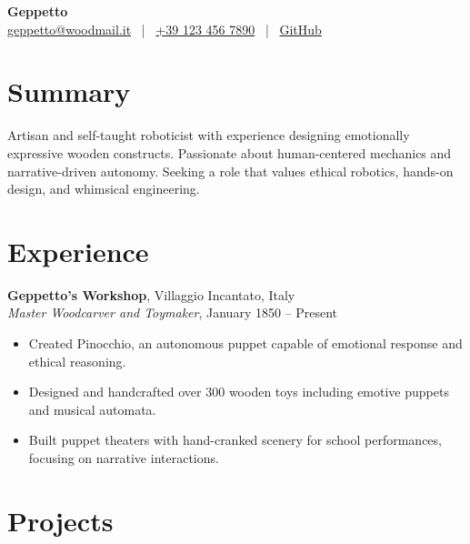 \documentclass[10pt]{article}
\begin{document}
\begin{center}
    {\Large\bfseries{Geppetto}}\\[0.2em]
    {\normalsize
        \href{mailto:geppetto@woodmail.it}{geppetto@woodmail.it} ~|~
        \href{tel:+39 123 456 7890}{+39 123 456 7890} ~|~
        \href{https://github.com/geppetto-works}{GitHub}
    }
\end{center}

\vspace{0.5em}


\section*{Summary}

Artisan and self-taught roboticist with experience designing emotionally expressive wooden constructs. Passionate about human-centered mechanics and narrative-driven autonomy. Seeking a role that values ethical robotics, hands-on design, and whimsical engineering.



\section*{Experience}

\textbf{Geppetto's Workshop}, \hfill Villaggio Incantato, Italy \\
\textit{Master Woodcarver and Toymaker}, \hfill January 1850 -- Present
\begin{itemize}[leftmargin=*, noitemsep, topsep=0.1em]

    \item Created Pinocchio, an autonomous puppet capable of emotional response and ethical reasoning.

    \item Designed and handcrafted over 300 wooden toys including emotive puppets and musical automata.

    \item Built puppet theaters with hand-cranked scenery for school performances, focusing on narrative interactions.

\end{itemize}
\vspace{0.3em}


\section*{Projects}
\end{document}
